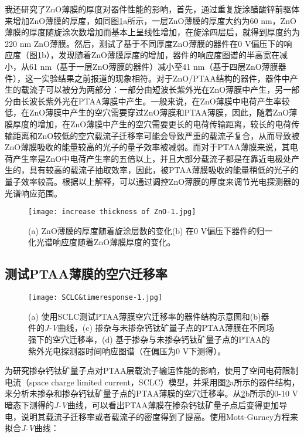 \documentclass[forlib]{WHUMaster}   %
\begin{document}
{我还研究了ZnO薄膜的厚度对器件性能的影响，首先，通过重复旋涂醋酸锌前驱体来增加ZnO薄膜的厚度，如同图\ref{fig:2.4.1}a所示，一层ZnO薄膜的厚度大约为60 nm，ZnO薄膜的厚度随旋涂次数增加而基本上呈线性增加，在旋涂四层后，就得到厚度约为220 nm ZnO薄膜。然后，测试了基于不同厚度ZnO薄膜的器件在0 V偏压下的响应度（图\ref{fig:2.4.1}b），发现随着ZnO薄膜厚度的增加，器件的响应度图谱的半高宽在减小，从61 nm（基于一层ZnO薄膜的器件）减小至41 nm（基于四层ZnO薄膜器件），这一实验结果之前报道的现象相符\cite{RN25}。对于ZnO/PTAA结构的器件，器件中产生的载流子可以被分为两部分：一部分由短波长紫外光在ZnO薄膜中产生，另一部分由长波长紫外光在PTAA薄膜中产生。一般来说，在ZnO薄膜中电荷产生率较低，在ZnO薄膜中产生的空穴需要穿过ZnO薄膜和PTAA薄膜，因此，随着ZnO薄膜厚度的增加，在ZnO薄膜中产生的空穴需要更长的电荷传输距离，较长的电荷传输距离和ZnO较低的空穴载流子迁移率可能会导致严重的载流子复合，从而导致被ZnO薄膜吸收的能量较高的光子的量子效率被减弱。而对于PTAA薄膜来说，其电荷产生率是ZnO中电荷产生率的五倍以上，并且大部分载流子都是在靠近电极处产生的，具有较高的载流子抽取效率，因此，被PTAA薄膜吸收的能量稍低的光子的量子效率较高。根据以上解释，可以通过调控ZnO薄膜的厚度来调节光电探测器的光谱响应范围。%

\begin{figure}[htb]
\centering
  \texttt{[image: increase thickness of ZnO-1.jpg]}
  \caption{\rm (a) ZnO薄膜的厚度随着旋涂层数的变化(b) 在0 V偏压下器件的归一化光谱响应度随着ZnO薄膜厚度的变化。}
  \label{fig:2.4.1}
\end{figure}


\subsection{测试PTAA薄膜的空穴迁移率}

\begin{figure}[htb]
\centering
  \texttt{[image: SCLC\&timeresponse-1.jpg]}
  \caption{\rm (a) 使用SCLC测试PTAA薄膜空穴迁移率的器件结构示意图和(b)器件的\emph{J-V}曲线，(c) 掺杂与未掺杂钙钛矿量子点的PTAA薄膜在不同场强下的空穴迁移率，(d) 基于掺杂与未掺杂钙钛矿量子点的PTAA的紫外光电探测器时间响应图谱（在偏压为0 \si{V}下测得）。}
  \label{fig:2.5}
\end{figure}

为研究掺杂钙钛矿量子点对PTAA层载流子输运性能的影响，使用了空间电荷限制电流（space charge limited current，SCLC）模型，并采用图\ref{fig:2.5}a所示的器件结构，来分析未掺杂和掺杂钙钛矿量子点的PTAA薄膜的空穴迁移率。从\ref{fig:2.5}b所示的0-10 V 暗态下测得的\emph{J-V}曲线，可以看出PTAA薄膜在掺杂钙钛矿量子点后变得更加导电，说明其载流子迁移率或者载流子的密度得到了提高。使用Mott-Gurney方程来拟合\emph{J-V}曲线：

}
\end{document}

